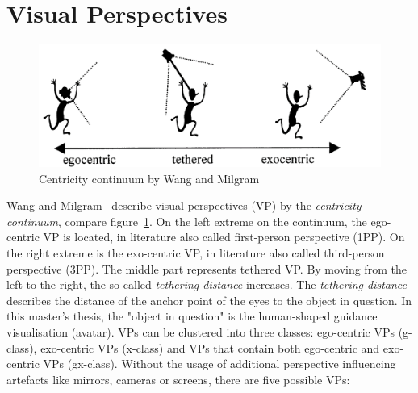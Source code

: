 \section{Visual Perspectives}
\label{section:visual_perspectives}
\begin{figure}[H]
	\centering
	\includegraphics[width=\textwidth]{figures/ego_exo_continuum.PNG}
	\caption[Centricity continuum by Wang et al.]{Centricity continuum by Wang and Milgram~\cite{centricitycontinuum}}
	\label{fig:ego-exo-continuum}
\end{figure}
Wang and Milgram~\cite{centricitycontinuum} describe visual perspectives (VP) by the \textit{centricity continuum}, compare figure~\ref{fig:ego-exo-continuum}. On the left extreme on the continuum, the ego-centric VP is located, in literature also called first-person perspective (1PP). On the right extreme is the exo-centric VP, in literature also called third-person perspective (3PP). The middle part represents tethered VP. By moving from the left to the right, the so-called \textit{tethering distance} increases. The \textit{tethering distance} describes the distance of the anchor point of the eyes to the object in question. In this master's thesis, the "object in question" is the human-shaped guidance visualisation (avatar). VPs can be clustered into three classes: ego-centric VPs (g-class), exo-centric VPs (x-class) and VPs that contain both ego-centric and exo-centric VPs (gx-class). Without the usage of additional perspective influencing artefacts like mirrors, cameras or screens, there are five possible VPs:
